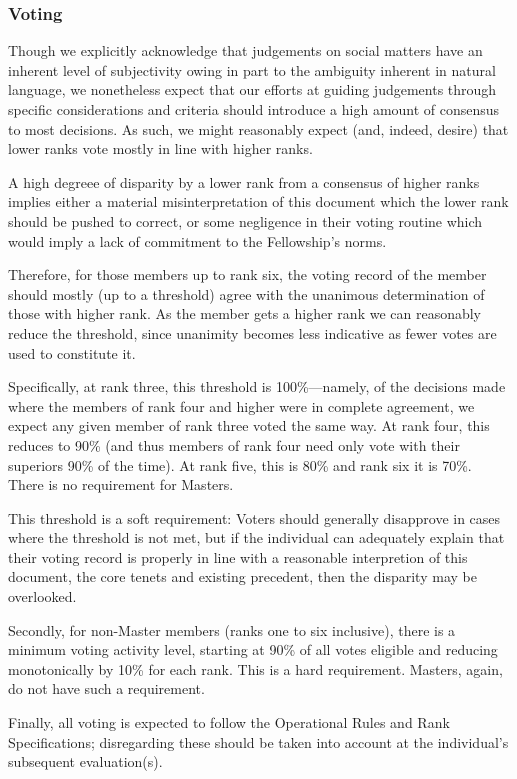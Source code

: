 \documentclass[9pt,oneside]{amsart}
\begin{document}
\subsubsection{Voting}

Though we explicitly acknowledge that judgements on social matters have an inherent level of subjectivity owing in part to the ambiguity inherent in natural language, we nonetheless expect that our efforts at guiding judgements through specific considerations and criteria should introduce a high amount of consensus to most decisions. As such, we might reasonably expect (and, indeed, desire) that lower ranks vote mostly in line with higher ranks.

A high degreee of disparity by a lower rank from a consensus of higher ranks implies either a material misinterpretation of this document which the lower rank should be pushed to correct, or some negligence in their voting routine which would imply a lack of commitment to the Fellowship's norms.

Therefore, for those members up to rank six, the voting record of the member should mostly (up to a threshold) agree with the unanimous determination of those with higher rank. As the member gets a higher rank we can reasonably reduce the threshold, since unanimity becomes less indicative as fewer votes are used to constitute it.

Specifically, at rank three, this threshold is 100\%---namely, of the decisions made where the members of rank four and higher were in complete agreement, we expect any given member of rank three voted the same way. At rank four, this reduces to 90\% (and thus members of rank four need only vote with their superiors 90\% of the time). At rank five, this is 80\% and rank six it is 70\%. There is no requirement for Masters.

This threshold is a soft requirement: Voters should generally disapprove in cases where the threshold is not met, but if the individual can adequately explain that their voting record is properly in line with a reasonable interpretion of this document, the core tenets and existing precedent, then the disparity may be overlooked.

Secondly, for non-Master members (ranks one to six inclusive), there is a minimum voting activity level, starting at 90\% of all votes eligible and reducing monotonically by 10\% for each rank. This is a hard requirement. Masters, again, do not have such a requirement.

Finally, all voting is expected to follow the Operational Rules and Rank Specifications; disregarding these should be taken into account at the individual's subsequent evaluation(s).
\end{document}
